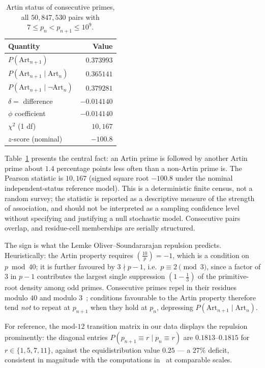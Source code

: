 \documentclass[11pt]{amsart}
\theoremstyle{definition}
\newcommand{\Lsym}[2]{\left(\tfrac{#1}{#2}\right)}
\newcommand{\Art}{\mathrm{Art}}
\begin{document}
\begin{table}[ht]
	\centering
	\caption{Artin status of consecutive primes, all $50{,}847{,}530$ pairs with
	$7 \le p_n < p_{n+1} \le 10^9$.}
	\label{tab:global}
	\begin{tabular}{lr}
		\toprule
		Quantity                         & Value       \\
		\midrule
		$P(\Art_{n+1})$                  & $0.373993$  \\
		$P(\Art_{n+1} \mid \Art_n)$      & $0.365141$  \\
		$P(\Art_{n+1} \mid \lnot\Art_n)$ & $0.379281$  \\
		$\delta = $ difference           & $-0.014140$ \\
		$\phi$ coefficient               & $-0.014140$ \\
		$\chi^2$ (1 df)                  & $10{,}167$  \\
		$z$-score (nominal)              & $-100.8$    \\
		\bottomrule
	\end{tabular}
\end{table}

Table~\ref{tab:global} presents the central fact: an Artin prime is followed by
another Artin prime about $1.4$ percentage points less often than a non-Artin
prime is. The Pearson statistic is $10{,}167$ (signed square root $-100.8$ under
the nominal independent-status reference model). This is a deterministic finite
census, not a random survey; the statistic is reported as a descriptive measure
of the strength of association, and should not be interpreted as a sampling
confidence level without specifying and justifying a null stochastic model.
Consecutive pairs overlap, and residue-cell memberships are serially structured.

The sign is what the Lemke Oliver--Soundararajan repulsion predicts.
Heuristically: the Artin property requires $\Lsym{10}{p} = -1$, which is a
condition on $p \bmod 40$; it is further favoured by $3 \nmid p - 1$, i.e.\
$p \equiv 2 \pmod 3$, since a factor of $3$ in $p-1$ contributes the largest
single suppression $(1 - \tfrac13)$ of the primitive-root density among odd
primes. Consecutive primes repel in their residues modulo $40$ and modulo
$3$~\cite{LOS2016}; conditions favourable to the Artin property therefore tend
\emph{not} to repeat at $p_{n+1}$ when they hold at $p_n$, depressing
$P(\Art_{n+1} \mid \Art_n)$.

For reference, the mod-$12$ transition matrix in our data displays the
repulsion prominently: the diagonal entries
$P(p_{n+1} \equiv r \mid p_n \equiv r)$ are $0.1813$--$0.1815$ for
$r \in \{1, 5, 7, 11\}$, against the equidistribution value $0.25$ --- a
$27\%$ deficit, consistent in magnitude with the computations
in~\cite{LOS2016} at comparable scales.
\end{document}
